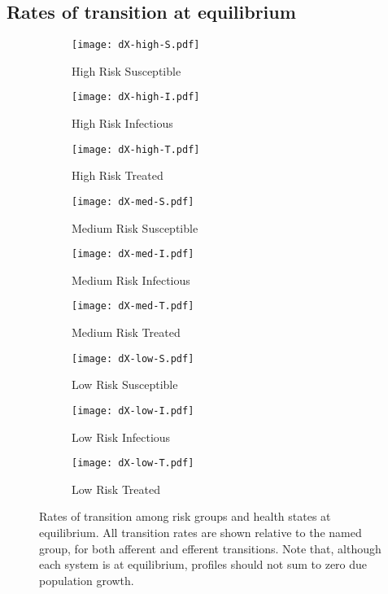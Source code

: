\subsection{Rates of transition at equilibrium}
\begin{figure}[H]
  \centering
  \begin{subfigure}{0.31\linewidth}
    \centering\texttt{[image: dX-high-S.pdf]}
    \caption{High Risk Susceptible}\label{fig:dX-high-S}
  \end{subfigure}
  \begin{subfigure}{0.31\linewidth}
    \centering\texttt{[image: dX-high-I.pdf]}
    \caption{High Risk Infectious}\label{fig:dX-high-I}
  \end{subfigure}
  \begin{subfigure}{0.31\linewidth}
    \centering\texttt{[image: dX-high-T.pdf]}
    \caption{High Risk Treated}\label{fig:dX-high-T}
  \end{subfigure}
  \begin{subfigure}{0.31\linewidth}
    \centering\texttt{[image: dX-med-S.pdf]}
    \caption{Medium Risk Susceptible}\label{fig:dX-med-S}
  \end{subfigure}
  \begin{subfigure}{0.31\linewidth}
    \centering\texttt{[image: dX-med-I.pdf]}
    \caption{Medium Risk Infectious}\label{fig:dX-med-I}
  \end{subfigure}
    \begin{subfigure}{0.31\linewidth}
    \centering\texttt{[image: dX-med-T.pdf]}
    \caption{Medium Risk Treated}\label{fig:dX-med-T}
  \end{subfigure}
  \begin{subfigure}{0.31\linewidth}
    \centering\texttt{[image: dX-low-S.pdf]}
    \caption{Low Risk Susceptible}\label{fig:dX-low-S}
  \end{subfigure}
  \begin{subfigure}{0.31\linewidth}
    \centering\texttt{[image: dX-low-I.pdf]}
    \caption{Low Risk Infectious}\label{fig:dX-low-I}
  \end{subfigure}
  \begin{subfigure}{0.31\linewidth}
    \centering\texttt{[image: dX-low-T.pdf]}
    \caption{Low Risk Treated}\label{fig:dX-low-T}
  \end{subfigure}
  \caption{Rates of transition among risk groups and health states at equilibrium.
    All transition rates are shown relative to the named group,
    for both afferent and efferent transitions.
    Note that, although each system is at equilibrium,
    profiles should not sum to zero due population growth.}
\end{figure}
